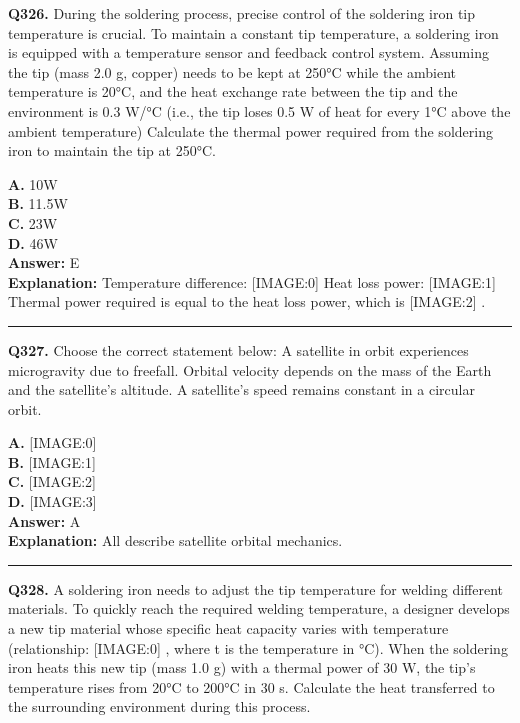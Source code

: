 \documentclass[12pt]{article}
\begin{document}
\noindent
\textbf{Q326.} During the soldering process, precise control of the soldering iron tip temperature is crucial. To maintain a constant tip temperature, a soldering iron is equipped with a temperature sensor and feedback control system. Assuming the tip (mass 2.0 g, copper) needs to be kept at 250°C while the ambient temperature is 20°C, and the heat exchange rate between the tip and the environment is 0.3 W/°C (i.e., the tip loses 0.5 W of heat for every 1°C above the ambient temperature)
Calculate the thermal power required from the soldering iron to maintain the tip at 250°C.



\textbf{A.} 10W \\
\textbf{B.} 11.5W \\
\textbf{C.} 23W \\
\textbf{D.} 46W \\

\textbf{Answer:} E \\
\textbf{Explanation:} Temperature difference:
[IMAGE:0]
Heat loss power:
[IMAGE:1]
Thermal power required is equal to the heat loss power, which is
[IMAGE:2]
.

\hrule
\vspace{1em}


\noindent
\textbf{Q327.} Choose the correct statement below:
A satellite in orbit experiences microgravity due to freefall.
Orbital velocity depends on the mass of the Earth and the satellite’s altitude.
A satellite’s speed remains constant in a circular orbit.



\textbf{A.} [IMAGE:0] \\
\textbf{B.} [IMAGE:1] \\
\textbf{C.} [IMAGE:2] \\
\textbf{D.} [IMAGE:3] \\

\textbf{Answer:} A \\
\textbf{Explanation:} All describe satellite orbital mechanics.

\hrule
\vspace{1em}


\noindent
\textbf{Q328.} A soldering iron needs to adjust the tip temperature for welding different materials. To quickly reach the required welding temperature, a designer develops a new tip material whose specific heat capacity varies with temperature (relationship:
[IMAGE:0]
, where t is the temperature in °C). When the soldering iron heats this new tip (mass 1.0 g) with a thermal power of 30 W, the tip's temperature rises from 20°C to 200°C in 30 s.
Calculate the heat transferred to the surrounding environment during this process.
\end{document}
